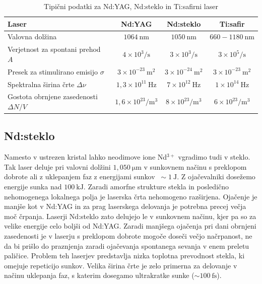 \begin{table}[h]
\small
\begin{center}
\begin{tabular}{|l|c|c|c|}\hline
Laser & Nd:YAG & Nd:steklo & Ti:safir \\ \hline
Valovna dolžina  & $1064~\si{\nano\metre}$ & $1050~\si{\nano\metre}$ & 
 $660-1180~\si{\nano\metre}$\\ \hline
Verjetnost za spontani prehod $A$ & $4 \times 10^3/\si{\second}$ & $3 \times 10^3/\si{\second}$
& $3 \times 10^5/\si{\second}$\\ \hline
Presek za stimulirano emisijo $\sigma$ & $3 \times 10^{-23}~\si{\metre}^2$ &
$3 \times 10^{-24}~\si{\metre}^2$ & $3 \times 10^{-23}~\si{\metre}^2$\\ \hline
Spektralna širina črte $\Delta \nu$ & $1,3 \times 10^{11}~\si{\hertz}$ &
$7 \times 10^{12}~\si{\hertz}$ & $1 \times 10^{14}~\si{\hertz}$\\ \hline
Gostota obrnjene zasedenosti $\Delta N/V$ & $1,6 \times 10^{23}/\si{\metre}^3$ &
$8 \times 10^{23}/\si{\metre}^3$ & $6 \times 10^{23}/\si{\metre}^3$\\ \hline
\end{tabular}
\caption{Tipični podatki za Nd:YAG, Nd:steklo in Ti:safirni laser}
\label{tab:nd}
\end{center}
\end{table}

\subsection{Nd:steklo}
Namesto v ustrezen kristal lahko neodimove ione Nd$^{3+}$ vgradimo tudi v steklo. 
Tak laser deluje pri valovni dolžini $1,050~\si{\micro\meter}$ v sunkovnem načinu 
s preklopom dobrote ali z uklepanjem faz z energijami sunkov $~\sim 1~\si{\joule}$.
Z ojačevalniki dosežemo energije sunka nad $100~\si{\kilo\joule}$. 
Zaradi amorfne strukture stekla in posledično 
nehomogenega lokalnega polja je laserska črta nehomogeno razširjena.
Ojačenje je manjše kot v Nd:YAG in za prag laserskega delovanja je
potrebna precej večja moč črpanja. Laserji Nd:steklo zato delujejo le v sunkovnem
načinu, kjer pa so za velike energije celo boljši od Nd:YAG. Zaradi
manjšega ojačenja pri dani obrnjeni zasedenosti je v laserju s preklopom
dobrote mogoče doseči večjo načrpanost, ne da bi prišlo do praznjenja
zaradi ojačevanja spontanega sevanja v enem preletu paličice. Problem teh laserjev
predstavlja nizka toplotna prevodnost stekla, ki omejuje repeticijo sunkov.
Velika širina črte je zelo primerna za delovanje v načinu uklepanja faz, s 
katerim dosegamo ultrakratke sunke ($\sim 100~\si{\femto\second}$). 

